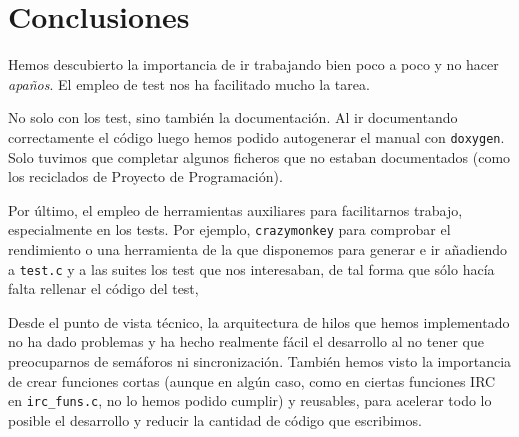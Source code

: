 \documentclass{article}
\begin{document}
\section{Conclusiones}

Hemos descubierto la importancia de ir trabajando bien poco a poco y no hacer \textit{apaños}. El empleo de test nos ha facilitado mucho la tarea. 

No solo con los test, sino también la documentación. Al ir documentando correctamente el código luego hemos podido autogenerar el manual con \texttt{doxygen}. Solo tuvimos que completar algunos ficheros que no estaban documentados (como los reciclados de Proyecto de Programación).

Por último, el empleo de herramientas auxiliares para facilitarnos trabajo, especialmente en los tests. Por ejemplo, \texttt{crazymonkey} para comprobar el rendimiento o una herramienta de la que disponemos para generar e ir añadiendo a \texttt{test.c} y a las suites los test que nos interesaban, de tal forma que sólo hacía falta rellenar el código del test, 

Desde el punto de vista técnico, la arquitectura de hilos que hemos implementado no ha dado problemas y ha hecho realmente fácil el desarrollo al no tener que preocuparnos de semáforos ni sincronización. También hemos visto la importancia de crear funciones cortas (aunque en algún caso, como en ciertas funciones IRC en \texttt{irc\_funs.c}, no lo hemos podido cumplir) y reusables, para acelerar todo lo posible el desarrollo y reducir la cantidad de código que escribimos.
\end{document}
